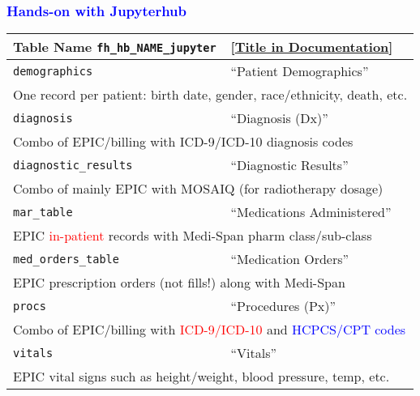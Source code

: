 \documentclass[11pt,pdftex,dvipsnames,usenames]{beamer}
\begin{document}
\begin{frame}[fragile]\frametitle{\bf\textcolor{blue}{Hands-on with Jupyterhub}}
\begin{tabular}{lll}
Table Name \texttt{fh\_hb\_NAME\_jupyter} & 
\textcolor{PineGreen}{[\href{https://ctri.mcw.edu/wp-content/uploads/CTSI-Honest-Broker-Data-Dictionary.pdf}{Title in Documentation}]} \\ \hline
\texttt{demographics}       & ``Patient Demographics'' \\ 
\multicolumn{3}{l}{One record per patient: birth date, gender, 
race/ethnicity, death, etc.} \\ \hline 
\texttt{diagnosis}          & ``Diagnosis (Dx)'' \\
\multicolumn{3}{l}{Combo of EPIC/billing with ICD-9/ICD-10 
diagnosis codes} \\  \hline  
\texttt{diagnostic\_results}& ``Diagnostic Results'' \\
\multicolumn{3}{l}{Combo of mainly EPIC with MOSAIQ (for radiotherapy dosage)} \\  \hline  
\texttt{mar\_table}         & ``Medications Administered''\\
\multicolumn{3}{l}{EPIC \textcolor{red}{in-patient} records with Medi-Span pharm class/sub-class} \\   \hline 
\texttt{med\_orders\_table} & ``Medication Orders'' \\
\multicolumn{3}{l}{EPIC prescription orders (not fills!) along with Medi-Span} \\  \hline  
\texttt{procs}              & ``Procedures (Px)'' \\
\multicolumn{3}{l}{Combo of EPIC/billing with 
\textcolor{red}{ICD-9/ICD-10} 
and \textcolor{blue}{HCPCS/CPT codes}} \\  \hline  
\texttt{vitals}             & ``Vitals'' \\
\multicolumn{3}{l}{EPIC vital signs such as height/weight, blood pressure,
temp, etc. } \\   \hline 
\end{tabular}
\end{frame}
\end{document}
